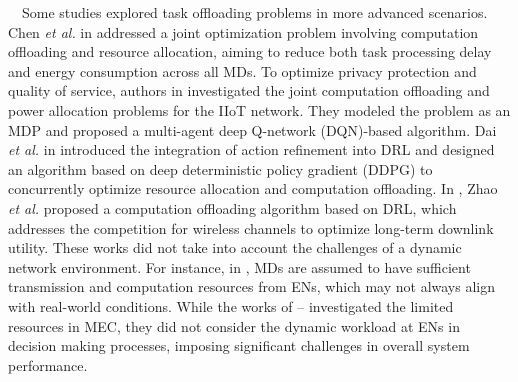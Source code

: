 \documentclass[12pt,draftclsnofoot,onecolumn]{IEEEtran}
\newenvironment{my}[2]%
{\begin{list}{}%
{\setlength{\rightmargin}{#1}\setlength{\leftmargin}{#2}}%


 \item[]{}

} {\end{list}}
\begin{document}
\begin{enumerate}
\begin{my}{1cm}{1cm}
{		\,\,\,\, Some studies explored task offloading problems in more advanced scenarios. Chen \textit{et al.} in \cite{chen2021drl} addressed a joint optimization problem involving computation offloading and resource allocation, aiming to reduce both task processing delay and energy consumption across all MDs.
		To optimize privacy protection and quality of service, authors in \cite{wu2024privacy} investigated the joint computation offloading and power allocation problems for the IIoT network. They modeled the problem as an MDP and proposed a multi-agent deep Q-network (DQN)-based algorithm.
		Dai \textit{et al.} in \cite{dai2020edge} introduced the integration of action refinement into DRL and designed an algorithm based on deep deterministic policy gradient (DDPG) to concurrently optimize resource allocation and computation offloading.
		In \cite{zhao2019deep}, Zhao \textit{et al.} proposed a computation offloading algorithm based on DRL, which addresses the competition for wireless channels to optimize long-term downlink utility.
		These works did not take into account the challenges of a dynamic network environment. For instance, in \cite{chen2021drl}, MDs are assumed to have sufficient transmission and computation resources from ENs, which may not always align with real-world conditions. While the works of \cite{wu2024privacy}--\cite{zhao2019deep} investigated the limited resources in MEC, they did not consider the dynamic workload at ENs in decision making processes, imposing significant challenges in overall system performance.
}
\end{my}
\end{enumerate}
\end{document}
